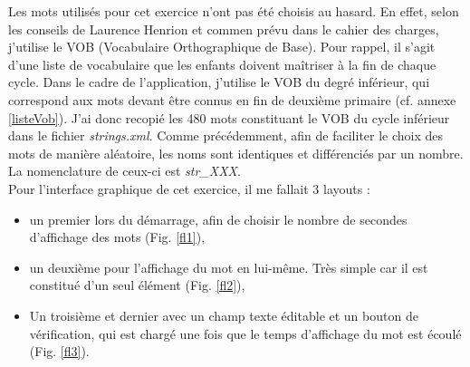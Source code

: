 Les mots utilisés pour cet exercice n'ont pas été choisis au hasard. En effet, selon les conseils de Laurence Henrion et commen prévu dans le cahier des charges, j'utilise le VOB (Vocabulaire Orthographique de Base). Pour rappel, il s'agit d'une liste de vocabulaire que les enfants doivent maîtriser à la fin de chaque cycle. Dans le cadre de l'application, j'utilise le VOB du degré inférieur, qui correspond aux mots devant être connus en fin de deuxième primaire (cf. annexe \ref{listeVob}). J'ai donc recopié les 480 mots constituant le VOB du cycle inférieur dans le fichier \textit{strings.xml}. Comme précédemment, afin de faciliter le choix des mots de manière aléatoire, les noms sont identiques et différenciés par un nombre. La nomenclature de ceux-ci est \textit{str\_XXX}. \\

Pour l'interface graphique de cet exercice, il me fallait 3 layouts :
\begin{itemize}
\item un premier lors du démarrage, afin de choisir le nombre de secondes d'affichage des mots (Fig. \ref{fl1}),
\item un deuxième pour l'affichage du mot en lui-même. Très simple car il est constitué d'un seul élément (Fig. \ref{fl2}),
\item Un troisième et dernier avec un champ texte éditable et un bouton de vérification, qui est chargé une fois que le temps d'affichage du mot est écoulé (Fig. \ref{fl3}).\\
\end{itemize}

